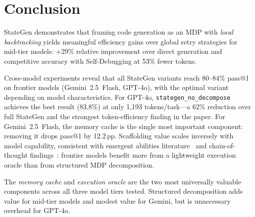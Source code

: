 \documentclass[11pt,twocolumn]{article}
\begin{document}
\section{Conclusion}

StateGen demonstrates that framing code generation as an MDP with
\emph{local backtracking} yields meaningful efficiency gains over global
retry strategies for mid-tier models: $+$29\% relative improvement over
direct generation and competitive accuracy with Self-Debugging at 53\% fewer
tokens.

Cross-model experiments reveal that all StateGen variants reach 80--84\%
pass@1 on frontier models (Gemini~2.5~Flash, GPT-4o), with the optimal variant
depending on model characteristics.
For GPT-4o, \texttt{stategen\_no\_decompose} achieves the best result
(83.8\%) at only 1,193 tokens/task---a 62\% reduction over full StateGen
and the strongest token-efficiency finding in the paper.
For Gemini~2.5~Flash, the memory cache is the single most important component:
removing it drops pass@1 by 12.2\,pp.
Scaffolding value scales inversely with model capability, consistent with
emergent abilities literature~\cite{wei2022emergent} and chain-of-thought
findings~\cite{kojima2022zeroshot}: frontier models benefit more from a
lightweight execution oracle than from structured MDP decomposition.

The \emph{memory cache} and \emph{execution oracle} are the two most
universally valuable components across all three model tiers tested.
Structured decomposition adds value for mid-tier models and modest value for
Gemini, but is unnecessary overhead for GPT-4o.
\end{document}
